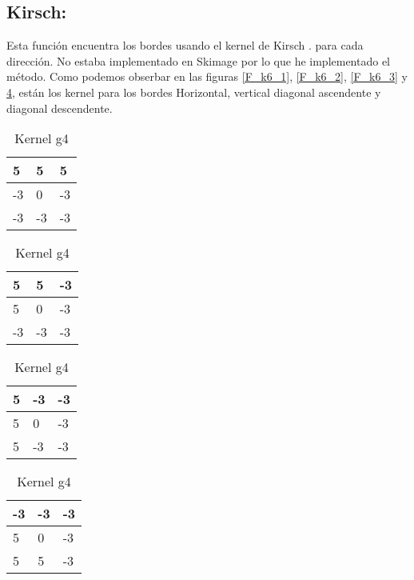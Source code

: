 \subsection{Kirsch:}
Esta función encuentra los bordes usando el kernel de Kirsch \cite{wiki:Kirsch}.
para cada dirección.
No estaba implementado en Skimage por lo que he implementado el método.
Como podemos obserbar en las figuras \ref{F_k6_1}, \ref{F_k6_2}, \ref{F_k6_3} y \ref{F_k6_4}, están los kernel para los bordes Horizontal, vertical diagonal ascendente y diagonal descendente.
\begin{table}[!htb]

	\begin{minipage}{.5\linewidth}
		\centering
		\caption{Kernel g1}
		\label{F_k6_1}
		\begin{tabular}{|l|l|l|}
			\hline
			5  & 5  & 5  \\ \hline
			-3 & 0  & -3 \\ \hline
			-3 & -3 & -3 \\ \hline
		\end{tabular}
    \end{minipage}%
	\begin{minipage}{.5\linewidth}
		\centering
		\caption{Kernel g2}
		\label{F_k6_2}
		\begin{tabular}{|l|l|l|}
			\hline
			5  & 5  & -3  \\ \hline
			5 & 0  & -3 \\ \hline
			-3 & -3 & -3 \\ \hline
		\end{tabular}
    \end{minipage}%


	\begin{minipage}{.5\linewidth}
		\centering
		\caption{Kernel g3}
		\label{F_k6_3}
		\begin{tabular}{|l|l|l|}
			\hline
			5  & -3 & -3  \\ \hline
			5 & 0  & -3 \\ \hline
			5 & -3 & -3 \\ \hline
		\end{tabular}
    \end{minipage}%
	\begin{minipage}{.5\linewidth}
		\centering
		\caption{Kernel g4}
		\label{F_k6_4}
		\begin{tabular}{|l|l|l|}
			\hline
			-3  & -3 & -3  \\ \hline
			5 & 0  & -3 \\ \hline
			5 & 5 & -3 \\ \hline
		\end{tabular}
    \end{minipage}%
\end{table}

